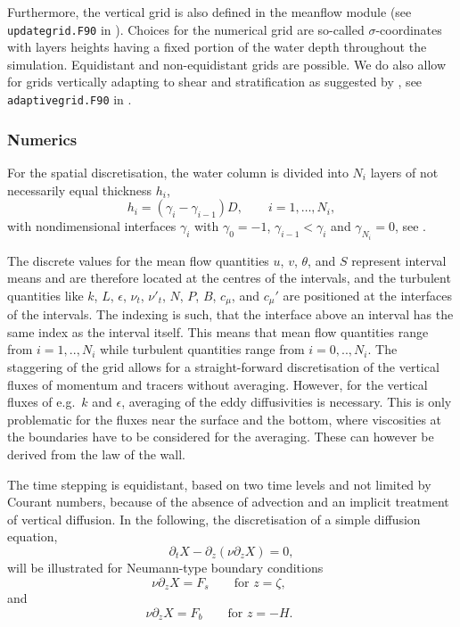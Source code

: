 Furthermore, the vertical grid is also defined in the meanflow module
(see {\tt updategrid.F90} in ). Choices for the
numerical grid are so-called $\sigma$-coordinates with layers
heights having a fixed portion of the water depth throughout the
simulation. Equidistant and non-equidistant grids are possible.  We
do also allow for grids vertically adapting to shear and
stratification as suggested by \cite{BurchardBeckers2003}, see {\tt
adaptivegrid.F90} in .

\subsubsection{Numerics}\label{SectionNumericsMean}

For the spatial discretisation, the water column is divided into $N_i$
layers of not necessarily equal thickness $h_i$,
\begin{equation}
  \label{grid}
   h_i=(\gamma_i-\gamma_{i-1})D, \qquad i=1,\dots,N_i
   \comma
\end{equation}
with nondimensional interfaces $\gamma_i$ with $\gamma_0=-1$,
$\gamma_{i-1}< \gamma_i$ and $\gamma_{N_i}=0$,
see \cite{BurchardPetersen97}.

The discrete values for the mean flow quantities $u$, $v$, $\theta$,
and $S$ represent interval means and are therefore located at the
centres of the intervals, and the turbulent quantities like $k$, $L$,
$\epsilon$, $\nu_t$, $\nu'_t$, $N$, $P$, $B$, $c_{\mu}$, and
$c_{\mu}'$ are positioned at the interfaces of the intervals.  The
indexing is such, that the interface above an interval has the same
index as the interval itself.  This means that mean flow quantities
range from $i=1,..,N_i$ while turbulent quantities range from
$i=0,..,N_i$.  The staggering of the grid allows for a
straight-forward discretisation of the vertical fluxes of momentum and
tracers without averaging.  However, for the vertical fluxes of e.g.\
$k$ and $\epsilon$, averaging of the eddy diffusivities is
necessary. This is only problematic for the fluxes near the surface
and the bottom, where viscosities at the boundaries have to be
considered for the averaging. These can however be derived from the
law of the wall.

The time stepping is equidistant, based on two time levels and not
limited by Courant numbers, because of the absence of advection and an
implicit treatment of vertical diffusion.  In the following, the
discretisation of a simple diffusion equation,
\begin{equation}
  \label{simpleDiffusion}
  \partial_t X - \partial_z(\nu \partial_z X)=0
  \comma
\end{equation}
will be illustrated for Neumann-type
boundary conditions
\begin{equation}
  \nu \partial_z X = F_s
  \qquad \mbox{for } z=\zeta,\qquad
\end{equation}
and
\begin{equation}
  \nu \partial_z X = F_b
  \qquad \mbox{for } z=-H.\qquad
\end{equation}

